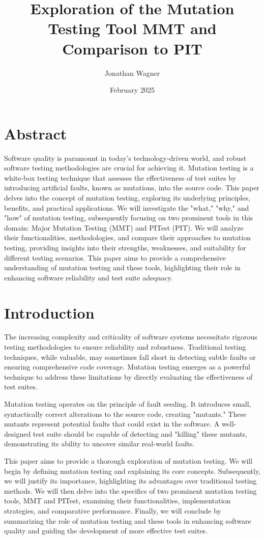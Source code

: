 \documentclass[sigplan, nonacm]{acmart}
\title{Exploration of the Mutation Testing Tool MMT and Comparison to PIT}
\author{Jonathan Wagner}
\affiliation{\institution{Philipps-University Marburg}
\city{Marburg}
\country{Germany}}
\date{February 2025}
\begin{document}
\maketitle

\section*{Abstract}

Software quality is paramount in today's technology-driven world, and robust software testing methodologies are crucial for achieving it. Mutation testing is a white-box testing technique that assesses the effectiveness of test suites by introducing artificial faults, known as mutations, into the source code. This paper delves into the concept of mutation testing, exploring its underlying principles, benefits, and practical applications. We will investigate the "what," "why," and "how" of mutation testing, subsequently focusing on two prominent tools in this domain: Major Mutation Testing (MMT) and PITest (PIT). We will analyze their functionalities, methodologies, and compare their approaches to mutation testing, providing insights into their strengths, weaknesses, and suitability for different testing scenarios. This paper aims to provide a comprehensive understanding of mutation testing and these tools, highlighting their role in enhancing software reliability and test suite adequacy.

\section{Introduction}

The increasing complexity and criticality of software systems necessitate rigorous testing methodologies to ensure reliability and robustness. Traditional testing techniques, while valuable, may sometimes fall short in detecting subtle faults or ensuring comprehensive code coverage. Mutation testing emerges as a powerful technique to address these limitations by directly evaluating the effectiveness of test suites.

Mutation testing operates on the principle of fault seeding. It introduces small, syntactically correct alterations to the source code, creating "mutants." These mutants represent potential faults that could exist in the software. A well-designed test suite should be capable of detecting and "killing" these mutants, demonstrating its ability to uncover similar real-world faults.

This paper aims to provide a thorough exploration of mutation testing. We will begin by defining mutation testing and explaining its core concepts. Subsequently, we will justify its importance, highlighting its advantages over traditional testing methods. We will then delve into the specifics of two prominent mutation testing tools, MMT and PITest, examining their functionalities, implementation strategies, and comparative performance. Finally, we will conclude by summarizing the role of mutation testing and these tools in enhancing software quality and guiding the development of more effective test suites.
\end{document}
